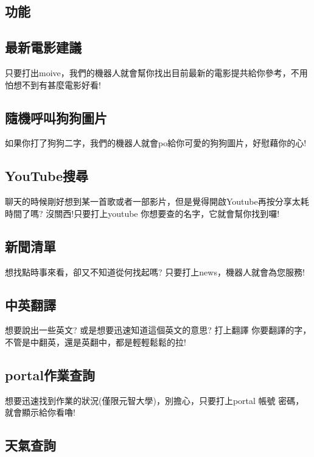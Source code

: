 \documentclass{scrreprt}
\begin{document}
\begin{CJK}{UTF8}{bkai}
\chapter{功能}

\section{最新電影建議}

只要打出{\color{red}moive}，我們的機器人就會幫你找出目前最新的電影提共給你參考，不用怕想不到有甚麼電影好看!

\section{隨機呼叫狗狗圖片}

如果你打了{\color{red}狗狗}二字，我們的機器人就會po給你可愛的狗狗圖片，好慰藉你的心!

\section{YouTube搜尋}

聊天的時候剛好想到某一首歌或者一部影片，但是覺得開啟Youtube再按分享太耗時間了嗎? 沒關西!只要打上{\color{red}youtube 你想要查的名字}，它就會幫你找到囉!

\section{新聞清單}

想找點時事來看，卻又不知道從何找起嗎? 只要打上{\color{red}news}，機器人就會為您服務!

\section{中英翻譯}

想要說出一些英文? 或是想要迅速知道這個英文的意思? 打上{\color{red}翻譯 你要翻譯的字}，不管是中翻英，還是英翻中，都是輕輕鬆鬆的拉!

\section{portal作業查詢}

想要迅速找到作業的狀況(僅限元智大學)，別擔心，只要打上{\color{red}portal 帳號 密碼}，就會顯示給你看嚕!

\section{天氣查詢}


\end{CJK}
\end{document}
